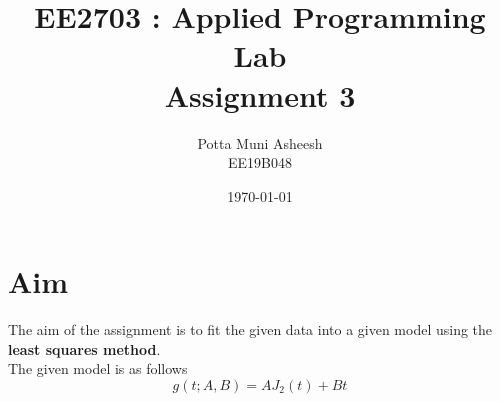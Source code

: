 \documentclass[12pt, a4paper]{report}
\title{\textbf{EE2703 : Applied Programming Lab \\ Assignment 3}} %
\author{Potta Muni Asheesh \\ EE19B048} %
\date{\today} %
\begin{document}
	
		
\maketitle %
\section*{Aim}
 The aim of the assignment is to fit the given data into a given model using the \textbf{least squares method}.\\
 The given model is as follows
 \begin{equation*}
 	g(t;A,B) = AJ_{2}(t) + Bt
 \end{equation*}
\end{document}

